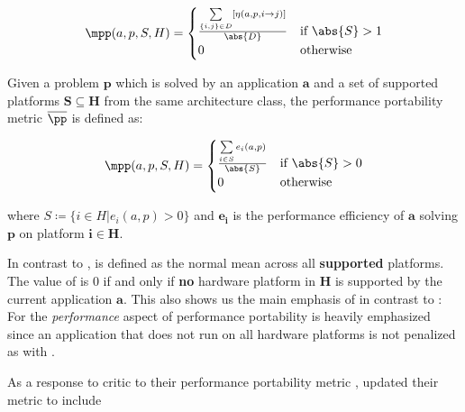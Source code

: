 \begin{definition}\label{def:pp_eff_pp}
$$\mpp(a, p, S, H) = 
        \begin{cases}
            \frac{\sum\limits_{\{i, j\} \in D} [\eta(a, p, i \rightarrow j)]}{\abs{D}} & \text{if }\abs{S} > 1 \\
            0                         & \text{otherwise}
        \end{cases}$$

\end{definition}


\newpage
{}
\cite{marowka_toward_2021, marowka_reformulation_2022, marowka_comparison_2023, marowka_portability_2024, marowka_inorrect_2024}


\begin{definition}\label{def:mpp}
    Given a problem $\mathbf{p}$ which is solved by an application $\mathbf{a}$ and a set of supported platforms $\mathbf{S \subseteq H}$ from the same architecture class, the performance portability metric $\overline{\pp}$ is defined as:

    \[ \mpp(a, p, S, H) = 
        \begin{cases}
            \frac{\sum\limits_{i \in S} e_i(a, p)}{\abs{S}} & \text{if }\abs{S} > 0 \\
            0                                               & \text{otherwise}
        \end{cases} 
    \]

    where $S \coloneqq \{ i \in H | e_i(a, p) > 0 \}$ and $\mathbf{e_i}$ is the performance efficiency of $\mathbf{a}$ solving $\mathbf{p}$ on platform $\mathbf{i \in H}$.
\end{definition}

In contrast to \pp, \mpp is defined as the normal mean across all \textbf{supported} platforms. 
The value of \mpp is $0$ if and only if \textbf{no} hardware platform in $\mathbf{H}$ is supported by the current application $\mathbf{a}$. 
This also shows us the main emphasis of \mpp in contrast to \pp: For \mpp the \textit{performance} aspect of performance portability is heavily emphasized since an application that does not run on all hardware platforms is not penalized as with \pp. 

As a response to \citeauthor{marowka_comparison_2023} critic to their performance portability metric \pp, \citet{pennycook_revisiting_2021} updated their metric to include 



